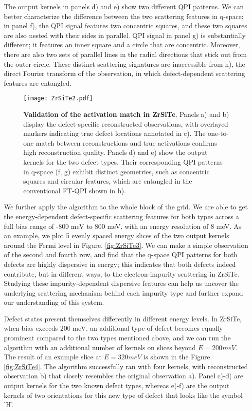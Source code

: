 The output kernels in panels d) and e) show two different QPI patterns. We can better characterize the difference between the two scattering features in q-space; in panel f), the QPI signal features two concentric squares, and these two squares are also nested with their sides in parallel. QPI signal in panel g) is substantially different; it features an inner square and a circle that are concentric. Moreover, there are also two sets of parallel lines in the radial directions that stick out from the outer circle. These distinct scattering signatures are inaccessible from h), the direct Fourier transform of the observation, in which defect-dependent scattering features are entangled.

\begin{figure}
	\texttt{[image: ZrSiTe2.pdf]} 
	\centering
	\caption[\textbf{Validation of the activation match in ZrSiTe}]{\textbf{Validation of the activation match in ZrSiTe}. Panels a) and b) display the defect-specific reconstructed observations, with overlayed markers indicating true defect locations annotated in c). The one-to-one match between reconstructions and true activations confirms high reconstruction quality. Panels d) and e) show the output kernels for the two defect types. Their corresponding QPI patterns in q-space (f, g) exhibit distinct geometries, such as concentric squares and circular features, which are entangled in the conventional FT-QPI shown in h).}
	\label{fig:ZrSiTe2}
\end{figure}

We further apply the algorithm to the whole block of the grid. We are able to get the energy-dependent defect-specific scattering features for both types across a full bias range of -800 meV to 800 meV, with an energy resolution of 8 meV. As an example, we plot 5 evenly spaced energy slices of the two output kernels around the Fermi level in Figure. \ref{fig:ZrSiTe3}. We can make a simple observation of the second and fourth row, and find that the q-space QPI patterns for both defects are highly dispersive in energy; this indicates that both defects indeed contribute, but in different ways, to the electron-impurity scattering in ZrSiTe. Studying these impurity-dependent dispersive features can help us uncover the underlying scattering mechanism behind each impurity type and further expand our understanding of this system. 

Defect states present themselves differently in different energy levels. In ZrSiTe, when bias exceeds 200 meV, an additional type of defect becomes equally prominent compared to the two types mentioned above, and we can run the algorithm with an additional number of kernels on slices beyond $E=200meV$. The result of an example slice at $E=320meV$ is shown in the Figure. \ref{fig:ZrSiTe4}. The algorithm successfully ran with four kernels, with reconstructed observation b) that closely resembles the original observation a). Panel c)-d) are output kernels for the two known defect types, whereas e)-f) are the output kernels of two orientations for this new type of defect that looks like the symbol 'H'.  

